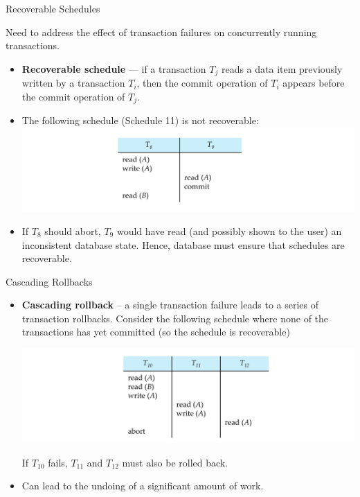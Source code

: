 \documentclass{beamer}
\begin{document}
\begin{frame}{Recoverable Schedules}

    Need to address the effect of transaction failures on concurrently running transactions.
    \begin{itemize}
        \item \textbf{Recoverable schedule} — if a transaction $T_j$ reads a data item previously written by a transaction $T_i$, then the commit operation of $T_i$ appears before the commit operation of $T_j$.
        \item The following schedule (Schedule 11) is not recoverable:
            \includegraphics[width=.9\textwidth]{figures/schedule1}
        \item If $T_8$ should abort, $T_9$ would have read (and possibly shown to the user) an inconsistent database state. Hence, database must ensure that schedules are recoverable.
    \end{itemize}

\end{frame}

\begin{frame}{Cascading Rollbacks}

    \begin{itemize}
        \item \textbf{Cascading rollback} – a single transaction failure leads to a series of transaction rollbacks. Consider the following schedule where none of the transactions has yet committed (so the schedule is recoverable)

            \includegraphics[width=.9\textwidth]{figures/cascade1}

        If $T_{10}$ fails, $T_{11}$ and $T_{12}$ must also be rolled back.

        \item Can lead to the undoing of a significant amount of work.
    \end{itemize}

\end{frame}
\end{document}
